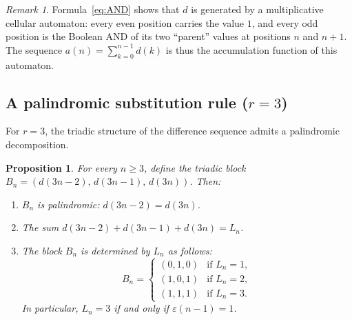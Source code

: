 \documentclass[12pt]{article}
\newtheorem{proposition}[theorem]{Proposition}
\theoremstyle{definition}
\theoremstyle{remark}
\newtheorem{remark}[theorem]{Remark}
\begin{document}
\begin{remark}
Formula~\eqref{eq:AND} shows that $d$ is generated by a multiplicative
cellular automaton: every even position carries the value $1$,
and every odd position is the Boolean AND of its two ``parent'' values
at positions $n$ and $n+1$.
The sequence $a(n)=\sum_{k=0}^{n-1}d(k)$ is thus the
accumulation function of this automaton.
\end{remark}

\subsection{A palindromic substitution rule ($r=3$)}

For $r=3$, the triadic structure of the difference sequence
admits a palindromic decomposition.

\begin{proposition}\label{prop:palindromic}
For every $n\ge 3$, define the triadic block
$B_n=(d(3n-2),\,d(3n-1),\,d(3n))$.
Then:
\begin{enumerate}[label=(\roman*)]
  \item $B_n$ is palindromic: $d(3n-2)=d(3n)$.
  \item The sum $d(3n-2)+d(3n-1)+d(3n)=L_n$.
  \item The block $B_n$ is determined by $L_n$ as follows:
    \[
      B_n=\begin{cases}
        (0,1,0) & \text{if } L_n=1,\\
        (1,0,1) & \text{if } L_n=2,\\
        (1,1,1) & \text{if } L_n=3.
      \end{cases}
    \]
    In particular, $L_n=3$ if and only if $\varepsilon(n-1)=1$.
\end{enumerate}
\end{proposition}
\end{document}
